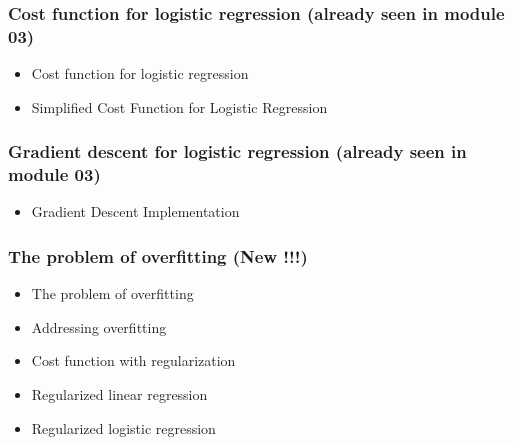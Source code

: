 \subsubsection*{Cost function for logistic regression (already seen in module 03)}
\begin{itemize}
  \item Cost function for logistic regression
  \item Simplified Cost Function for Logistic Regression
\end{itemize}

\subsubsection*{Gradient descent for logistic regression (already seen in module 03)}
\begin{itemize}
  \item Gradient Descent Implementation
\end{itemize}

\subsubsection*{The problem of overfitting (New !!!)}
\begin{itemize}
  \item The problem of overfitting
  \item Addressing overfitting
  \item Cost function with regularization
  \item Regularized linear regression
  \item Regularized logistic regression  
\end{itemize}

